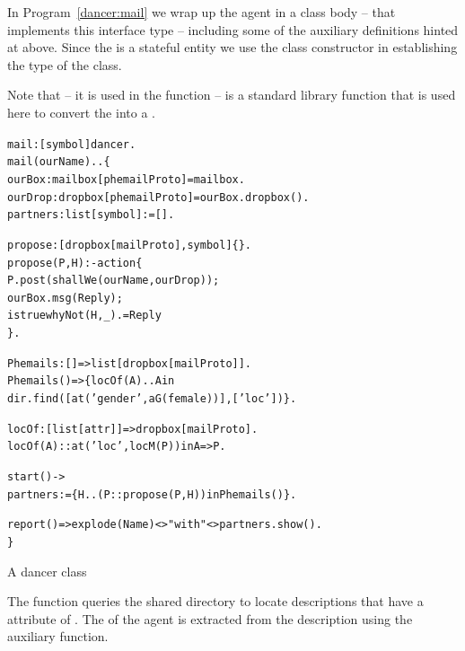 In Program~\vref{dancer:mail} we wrap up the \mail agent in a class body -- that implements this  interface type -- including some of the auxiliary definitions hinted at above. Since the \mail is a stateful entity we use the \sconarrow{} class constructor in establishing the type of the \mail class.

Note that  -- it is used in the  function -- is a standard library function that is used here to convert the   into a .

\begin{program}[bt]
\vspace{0.5ex}
\begin{alltt}
mail:[symbol]\sconarrow{}dancer.
mail(ourName)..\{
  ourBox:mailbox[phemailProto] = mailbox.
  ourDrop:dropbox[phemailProto] = ourBox.dropbox().
  partners:list[symbol] := [].

  propose:[dropbox[mailProto],symbol]\{\}.
  propose(P,H) :- action\{
     P.post(shallWe(ourName,ourDrop));
     ourBox.msg(Reply);
     istrue whyNot(H,_).=Reply
   \}.

  Phemails:[]=>list[dropbox[mailProto]].
  Phemails() => \{ locOf(A) .. A in 
     dir.find([at('gender',aG(female))],['loc']) \}.

  locOf:[list[attr]]=>dropbox[mailProto].
  locOf(A) :: at('loc',locM(P)) in A => P.

  start() -> 
     partners := \{ H..(P::propose(P,H)) in Phemails() \}.

  report() => explode(Name)<>" with "<>partners.show().
\}
\end{alltt}
\vspace{-2ex}
\caption{A \mail dancer class}
\label{dancer:mail}
\end{program}

The  function queries the shared directory to locate descriptions that have a  attribute of . The  of the \phemail agent is extracted from the description using the  auxiliary function.

